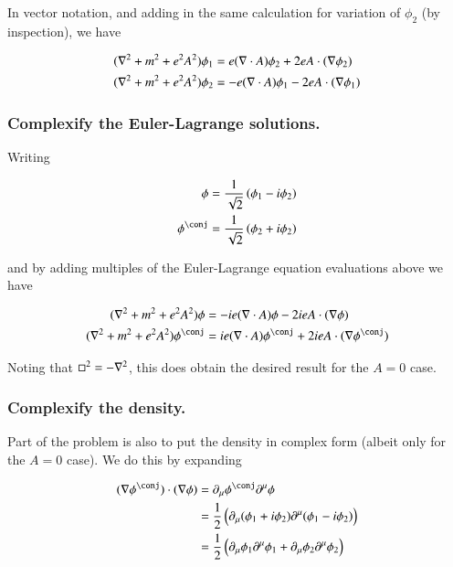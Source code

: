 \documentclass{article}
\begin{document}
In vector notation, and adding in the same calculation for variation of $\phi_2$ (by inspection), we have

\begin{align}
(\nabla^2 + m^2 + e^2 A^2) \phi_1 &= e (\nabla \cdot A) \phi_2 + 2 e A \cdot (\nabla \phi_2) \\
(\nabla^2 + m^2 + e^2 A^2) \phi_2 &= - e (\nabla \cdot A) \phi_1 - 2 e A \cdot (\nabla \phi_1)
\end{align}

\subsubsection{ Complexify the Euler-Lagrange solutions. }

Writing

\begin{align*}
\phi &= \inv{\sqrt{2}}\left( \phi_1 - i \phi_2 \right) \\
\phi^\conj &= \inv{\sqrt{2}}\left( \phi_2 + i \phi_2 \right) \\
\end{align*}

and by adding multiples of the Euler-Lagrange equation evaluations above we have

\begin{align}\label{eqn:complexifiedSolution}
(\grad^2 + m^2 + e^2 A^2 ) \phi &= -i e (\grad \cdot A) \phi - 2 i e A \cdot (\grad \phi) \\
(\grad^2 + m^2 + e^2 A^2 ) \phi^\conj &= i e (\grad \cdot A) \phi^\conj + 2 i e A \cdot (\grad \phi^\conj) 
\end{align}

Noting that $\square^2 = -\nabla^2$, this does obtain the desired result for the $A=0$ case.

\subsubsection{ Complexify the density. }

Part of the problem is also to put the density in complex form (albeit only for the $A=0$ case).  We do this by expanding

\begin{align*}
(\grad \phi^\conj) \cdot (\grad \phi) 
&= \partial_\mu \phi^\conj \partial^\mu \phi \\
&=
\inv{2} \left( \partial_\mu (\phi_1 + i \phi_2) \partial^\mu (\phi_1 - i \phi_2) \right) \\
&=
\inv{2} \left( \partial_\mu \phi_1 \partial^\mu \phi_1 + \partial_\mu \phi_2 \partial^\mu \phi_2 \right) \\
\end{align*}
\end{document}
